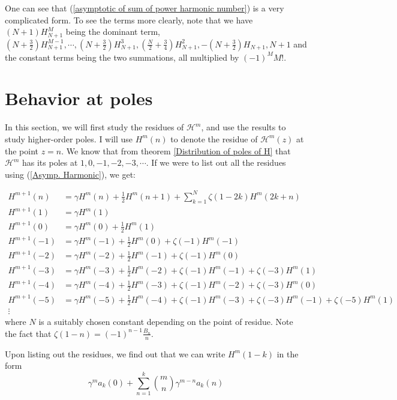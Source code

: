 \documentclass{article}
\begin{document}
One can see that (\ref{asymptotic of sum of power harmonic number}) is a very complicated form. To see the terms more clearly, note that we have $(N+1)H^M_{N+1}$ being the dominant term, $(N+\frac{3}{2})H^{M-1}_{N+1},\cdots,(N+\frac{3}{2})H^{3}_{N+1},(\frac{N}{2}+\frac{3}{4})H_{N+1}^2,-(N+\frac{3}{2})H_{N+1},N+1$ and the constant terms being the two summations, all multiplied by $(-1)^M M!$.

\section{Behavior at poles}
In this section, we will first study the residues of $\mathcal{H}^m$, and use the results to study higher-order poles.
I will use $H^m(n)$ to denote the residue of $\mathcal{H}^m(z)$ at the point $z=n$. We know that from theorem \ref{Distribution of poles of H} that $\mathcal{H}^m$ has its poles at $1,0,-1,-2,-3,\cdots$. If we were to list out all the residues using (\ref{Asymp. Harmonic}), we get:


\begin{equation}\label{Residues}\begin{split}
       H^{m+1}(n)& = \gamma H^m(n)+\frac{1}{2}H^m(n+1)+\sum_{k=1}^N\zeta(1-2k)H^{m}(2k+n) \\
       H^{m+1}(1) & =\gamma H^{m}(1) \\
       H^{m+1}(0) &=\gamma H^m(0)+\frac{1}{2} H^m(1)\\
       H^{m+1}(-1) & =\gamma H^m(-1)+\frac{1}{2}H^m(0)+\zeta(-1)H^m(-1)\\
       H^{m+1}(-2) & = \gamma H^m(-2)+\frac{1}{2} H^m(-1) +\zeta(-1) H^m (0) \\ 
       H^{m+1}(-3) & = \gamma H^m (-3)+\frac{1}{2}H^m (-2)+\zeta(-1)H^m(-1)+\zeta(-3)H^m(1) \\
       H^{m+1}(-4) & = \gamma H^m (-4)+\frac{1}{2}H^m (-3)+\zeta(-1)H^m(-2)+\zeta(-3)H^m(0) \\
       H^{m+1}(-5) & = \gamma H^m (-5)+\frac{1}{2}H^m (-4)+\zeta(-1)H^m(-3)+\zeta(-3)H^m(-1)+\zeta(-5)H^m(1) \\
       \vdots
\end{split}\end{equation}
where $N$ is a suitably chosen constant depending on the point of residue. Note the fact that $\zeta(1-n)=(-1)^{n-1}\frac{B_n}{n}$.
\par
Upon listing out the residues, we find out that we can write $H^m(1-k)$ in the form \begin{equation}\label{an}
   \gamma^m a_k(0)+\sum_{n=1}^k \binom{m}{n}\gamma^{m-n}a_k(n)
\end{equation}
\end{document}
